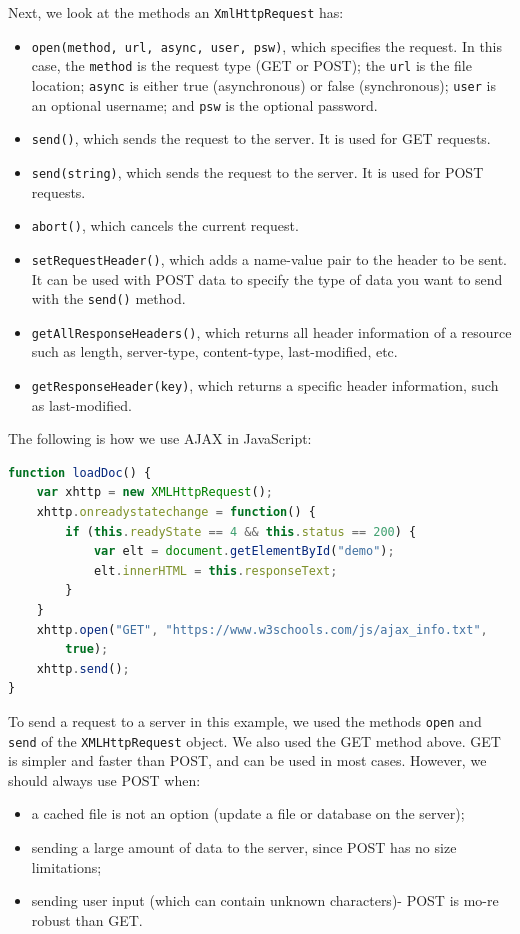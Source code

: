 \documentclass[a4paper, openany]{memoir}
\begin{document}
Next, we look at the methods an \texttt{XmlHttpRequest} has:
\begin{itemize}
    \item \texttt{open(method, url, async, user, psw)}, which specifies the request. In this case, the \texttt{method} is the request type (GET or POST); the \texttt{url} is the file location; \texttt{async} is either true (asynchronous) or false (synchronous); \texttt{user} is an optional username; and \texttt{psw} is the optional password.
    \item \texttt{send()}, which sends the request to the server. It is used for GET requests.
    \item \texttt{send(string)}, which sends the request to the server. It is used for POST requests.
    \item \texttt{abort()}, which cancels the current request.
    \item \texttt{setRequestHeader()}, which adds a name-value pair to the header to be sent. It can be used with POST data to specify the type of data you want to send with the \texttt{send()} method.
    \item \texttt{getAllResponseHeaders()}, which returns all header information of a resource such as length, server-type, content-type, last-modified, etc.
    \item \texttt{getResponseHeader(key)}, which returns a specific header information, such as last-modified.
\end{itemize}
The following is how we use AJAX in JavaScript:
\begin{lstlisting}[language=javascript]
function loadDoc() {
    var xhttp = new XMLHttpRequest();
    xhttp.onreadystatechange = function() {
        if (this.readyState == 4 && this.status == 200) {
            var elt = document.getElementById("demo");
            elt.innerHTML = this.responseText;
        }
    }
    xhttp.open("GET", "https://www.w3schools.com/js/ajax_info.txt", 
        true);
    xhttp.send();
}
\end{lstlisting}
To send a request to a server in this example, we used the methods \texttt{open} and \texttt{send} of the \texttt{XMLHttpRequest} object. We also used the GET method above. GET is simpler and faster than POST, and can be used in most cases. However, we should always use POST when:
\begin{itemize}
    \item a cached file is not an option (update a file or database on the server);
    \item sending a large amount of data to the server, since POST has no size limitations;
    \item sending user input (which can contain unknown characters)- POST is mo-re robust than GET.
\end{itemize}
\end{document}
